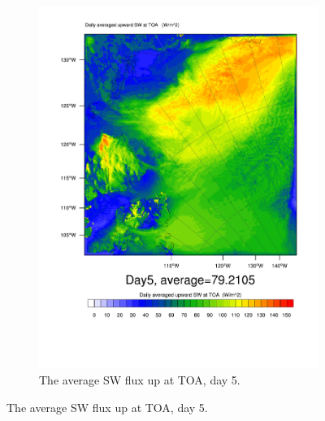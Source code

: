 \begin{figure}
\begin{subfigure}{0.48\textwidth}
		\includegraphics[width=\textwidth]{results/control/SWUPT_Day5.pdf}
		\caption{The average SW flux up at TOA, day 5.}
		\label{subfig:swup_r1Day5}
	\end{subfigure}
	

\end{figure}

